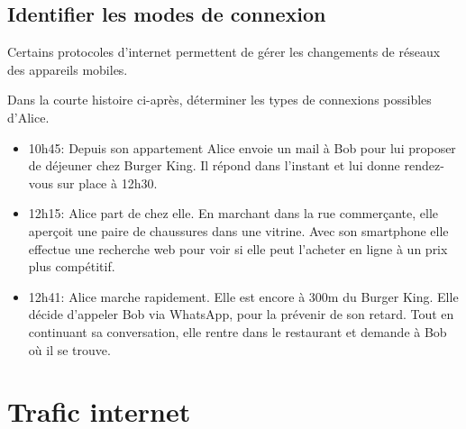 \documentclass[a4paper,11pt]{article}
\begin{document}
\begin{Form}
\subsection{Identifier les modes de connexion}
Certains protocoles d'internet permettent de gérer les changements de réseaux des appareils mobiles.
\begin{activite}
Dans la courte histoire ci-après, déterminer les types de connexions possibles d'Alice.
\begin{itemize}
\item 10h45: Depuis son appartement Alice envoie un mail à Bob pour lui proposer de déjeuner chez Burger King. Il répond dans l'instant et lui donne rendez-vous sur place à 12h30.
\item 12h15: Alice part de chez elle. En marchant dans la rue commerçante, elle aperçoit une paire de chaussures dans une vitrine. Avec son smartphone elle effectue une recherche web pour voir si elle peut l'acheter en ligne à un prix plus compétitif.
\item 12h41: Alice marche rapidement. Elle est encore à 300m du Burger King. Elle décide d'appeler Bob via WhatsApp, pour la prévenir de son retard. Tout en continuant sa conversation, elle rentre dans le restaurant et demande à Bob où il se trouve.
\end{itemize}
\end{activite}
\section{Trafic internet}

\end{Form}
\end{document}
